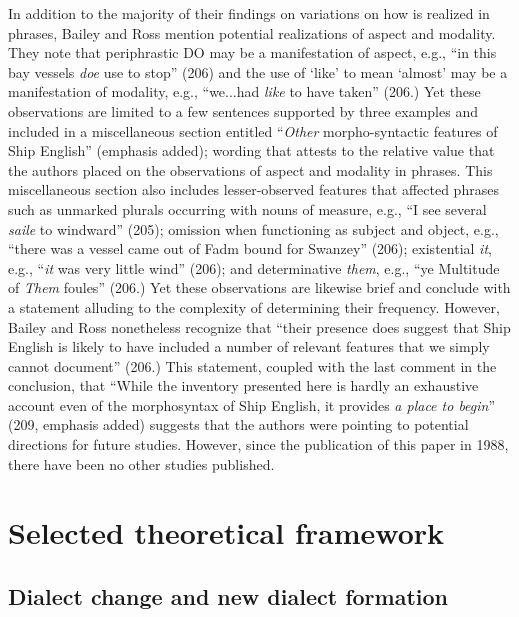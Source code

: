 In addition to the majority of their findings on variations on how  is realized in  phrases, Bailey and Ross mention potential realizations of aspect and modality. They note that periphrastic DO may be a manifestation of aspect, e.g., “in this bay vessels \textit{doe} use to stop” (206) and the use of ‘like’ to mean ‘almost’ may be a manifestation of modality, e.g., “we...had \textit{like} to have taken” (206.) Yet these observations are limited to a few sentences supported by three examples and included in a miscellaneous section entitled “\textit{Other} morpho-syntactic features of Ship English” (emphasis added); wording that attests to the relative value that the authors placed on the observations of aspect and modality in  phrases. This miscellaneous section also includes lesser-observed features that affected  phrases such as unmarked plurals occurring with nouns of measure, e.g., “I see several \textit{saile} to windward” (205);  omission when functioning as subject and object, e.g., “there was a vessel came out of Fadm bound for Swanzey” (206); existential \textit{it}, e.g., “\textit{it} was very little wind” (206); and determinative \textit{them}, e.g., “ye Multitude of \textit{Them} foules” (206.) Yet these observations are likewise brief and conclude with a statement alluding to the complexity of determining their frequency. However, Bailey and Ross nonetheless recognize that “their presence does suggest that Ship English is likely to have included a number of relevant features that we simply cannot document” (206.) This statement, coupled with the last comment in the conclusion, that “While the inventory presented here is hardly an exhaustive account even of the morphosyntax of Ship English, it provides \textit{a place to begin}” (209, emphasis added) suggests that the authors were pointing to potential directions for future studies. However, since the publication of this paper in 1988, there have been no other studies published.  

\section{{Selected} {theoretical} {framework}}%

\subsection{{Dialect} {change} {and} {new} {dialect} {formation} }%

